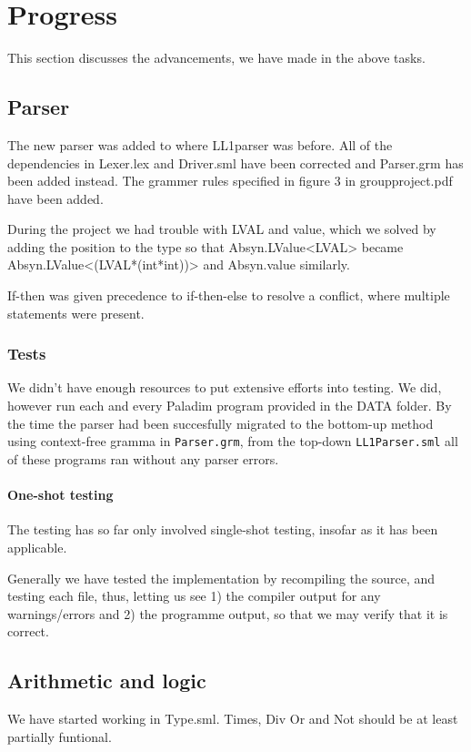 \documentclass[11pt]{article}
\begin{document}
\section{Progress}
This section discusses the advancements, we have made in the above tasks.

\subsection{Parser}
The new parser was added to where LL1parser was before.
All of the dependencies in Lexer.lex and Driver.sml have been corrected and Parser.grm has been added instead.
The grammer rules specified in figure 3 in groupproject.pdf have been added.

During the project we had trouble with LVAL and value, which we solved by adding the position to the type
so that Absyn.LValue<LVAL> became Absyn.LValue<(LVAL*(int*int))> and Absyn.value similarly.

If-then was given precedence to if-then-else to resolve a conflict, where multiple statements were present.

\subsubsection{Tests}
We didn't have enough resources to put extensive efforts into testing. We did,
however run each and every Paladim program provided in the DATA folder. By the
time the parser had been succesfully migrated to the bottom-up method using
context-free gramma in {\tt Parser.grm}, from the top-down {\tt LL1Parser.sml}
all of these programs ran without any parser errors.

\paragraph{One-shot testing}
The testing has so far only involved single-shot testing, insofar as it has
been applicable.

Generally we have tested the implementation by recompiling the source, and
testing each file, thus, letting us see 1) the compiler output for any
warnings/errors and 2) the programme output, so that we may verify that it
is correct.

\subsection{Arithmetic and logic}
We have started working in Type.sml. Times, Div Or and Not should be at least partially funtional.
\end{document}
